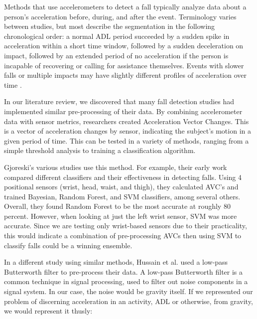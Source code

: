 \documentclass{llncs}
\begin{document}
    Methods that use accelerometers to detect a fall typically analyze data about a person's acceleration before, during, and after the event. Terminology varies between studies, but most describe the segmentation in the following chronological order: a normal ADL period succeeded by a sudden spike in acceleration within a short time window, followed by a sudden deceleration on impact, followed by an extended period of no acceleration if the person is incapable of recovering or calling for assistance themselves. Events with slower falls or multiple impacts may have slightly different profiles of acceleration over time \cite{kangas2009sensitivity}.
    
    In our literature review, we discovered that many fall detection studies had implemented similar pre-processing of their data. By combining accelerometer data with sensor metrics, researchers created Acceleration Vector Changes. This is a vector of acceleration changes by sensor, indicating the subject's motion in a given period of time. This can be tested in a variety of methods, ranging from a simple threshold analysis to training a classification algorithm. 
    
    Gjoreski's various studies use this method. For example, their early work compared different classifiers and their effectiveness in detecting falls. Using 4 positional sensors (wrist, head, waist, and thigh), they calculated AVC's and trained Bayesian, Random Forest, and SVM classifiers, among several others. Overall, they found Random Forest to be the most accurate at roughly 80 percent. However, when looking at just the left wrist sensor, SVM was more accurate. Since we are testing only wrist-based sensors due to their practicality, this would indicate a combination of pre-processing AVCs then using SVM to classify falls could be a winning ensemble. \cite{gjoreski2016accurately}
    
    In a different study using similar methods, Hussain et al. used a low-pass Butterworth filter to pre-process their data. A low-pass Butterworth filter is a common technique in signal processing, used to filter out noise components in a signal system. In our case, the noise would be gravity itself. If we represented our problem of discerning acceleration in an activity, ADL or otherwise, from gravity, we would represent it thusly:
    
    
\end{document}
